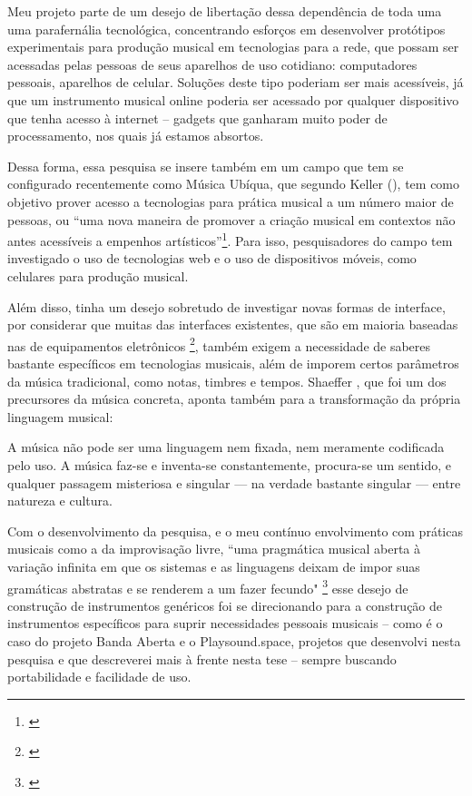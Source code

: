 Meu projeto parte de um desejo de libertação dessa dependência de toda uma uma parafernália tecnológica, concentrando esforços em desenvolver protótipos experimentais para produção musical em tecnologias para a rede, que possam ser acessadas pelas pessoas de seus aparelhos de uso cotidiano: computadores pessoais, aparelhos de celular. Soluções deste tipo poderiam ser mais acessíveis, já que um instrumento musical online poderia ser acessado por qualquer dispositivo que tenha acesso à internet -- gadgets que ganharam muito poder de processamento, nos quais já estamos absortos. 

Dessa forma, essa pesquisa se insere também em um campo que tem se configurado recentemente como Música Ubíqua, que segundo Keller (\citeyear{Keller2018}), tem como objetivo prover acesso a tecnologias para prática musical a um número maior de pessoas, ou ``uma nova maneira de promover a criação musical em contextos não antes acessíveis a empenhos artísticos''\footnote{\cite{Keller2018}}. Para isso, pesquisadores do campo tem investigado o uso de tecnologias web e o uso de dispositivos móveis, como celulares para produção musical. 

 Além disso, tinha um desejo sobretudo de investigar novas formas de interface, por considerar que muitas das interfaces existentes, que são em maioria baseadas nas de equipamentos eletrônicos \footnote{\cite{Stolfi2016}}, também exigem a necessidade de saberes bastante específicos em tecnologias musicais, além de imporem certos parâmetros da música tradicional, como notas, timbres e tempos. Shaeffer \citeyear{Schaeffer2007}, que foi um dos precursores da música concreta, aponta também para a transformação da própria linguagem musical: 


 \begin{citacao}
A música não pode ser uma linguagem nem fixada, nem meramente codificada pelo uso. A música faz-se e inventa-se constantemente, procura-se um sentido, e qualquer passagem misteriosa e singular — na verdade bastante singular — entre natureza e cultura. \cite{Schaeffer2007}
\end{citacao}

Com o desenvolvimento da pesquisa, e o meu contínuo envolvimento com práticas musicais como a da improvisação livre, ``uma pragmática musical aberta à variação infinita em que os sistemas e as linguagens deixam de impor suas gramáticas abstratas e se renderem a um fazer fecundo" \footnote{\cite[2]{Costa2016}} esse desejo de construção de instrumentos genéricos foi se direcionando para a construção de instrumentos específicos para suprir necessidades pessoais musicais -- como é o caso do projeto Banda Aberta e o Playsound.space, projetos que desenvolvi nesta pesquisa e que descreverei mais à frente nesta tese -- sempre buscando portabilidade e facilidade de uso. 


